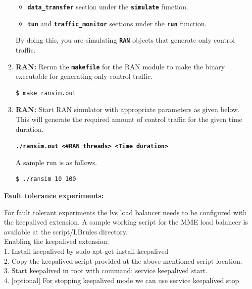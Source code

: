 \pdfminorversion=4\documentclass[hidelinks]{report}
\newcommand{\cf}[1] {
	\textbf{\texttt{#1}}
}
\begin{document}
\begin{enumerate}
\begin{itemize}

\item \cf{data\_transfer} section under the \cf{simulate} function.

\item \cf{tun} and \cf{traffic\_monitor} sections under the \cf{run} function.

\end{itemize}

By doing this, you are simulating \cf{RAN} objects that generate only control traffic.

\item \textbf{RAN:} Rerun the \cf{makefile} for the RAN module to make the binary executable for generating only control traffic.

\begin{lstlisting}[language=bash]
$ make ransim.out
\end{lstlisting}

\item \textbf{RAN:} Start RAN simulator with appropriate parameters as given below. This will generate the required amount of control traffic for the given time duration.

\begin{center}

\cf{./ransim.out <\#RAN threads> <Time duration>}

\end{center}

A sample run is as follows.

\begin{lstlisting}[language=bash]
$ ./ransim 10 100
\end{lstlisting}

\end{enumerate}

\noindent \textbf{Fault tolerance experiments:}

For fault tolerant experiments the lvs load balancer needs to be  configured with the keepalived extension. A sample working script for the  MME load balancer is available at the script/LBrules directory.\\


\noindent Enabling the keepalived extension:\\
1. Install keepalived by sudo apt-get install keepalived\\
2. Copy the keepalived script provided at the above mentioned script location.\\
3. Start keepalived in root with command: service keepalived start.\\
4. [optional] For stopping keepalived mode we can use service keepalived stop
\end{document}

